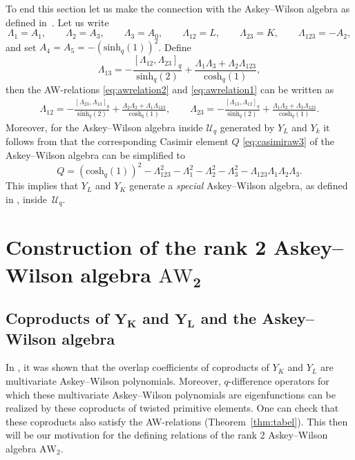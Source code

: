 \documentclass[10pt,a4paper]{amsart}
\numberwithin{equation}{section}
\newcommand{\AW}[1]{\mathrm{AW}_{#1}}
\newcommand{\bivariateawalgebra}{rank 2 Askey--Wilson algebra }
\newcommand{\chq}{\mathrm{cosh}_q}
\newcommand{\shq}{\mathrm{sinh}_q}
\newcommand{\Uq}{\mathcal{U}_q}
\begin{document}
To end this section let us make the connection with the Askey--Wilson algebra as defined in~\cite{CFGPRV2021}.
Let us write
\[
\Lambda_1=A_1, \qquad \Lambda_2=A_3, \qquad \Lambda_3=A_0,\qquad
\Lambda_{12} = L, \qquad \Lambda_{23}=K, \qquad \Lambda_{123}=-A_2,
\]
and set $A_4=A_5=-(\shq(1))^2$. Define
\[
\Lambda_{13}= -\frac{[\Lambda_{12},\Lambda_{23}]_q}{\shq(2)} + \frac{\Lambda_1 \Lambda_3+ \Lambda_2 \Lambda_{123}}{\chq(1)},
\]
then the AW-relations \eqref{eq:awrelation2} and \eqref{eq:awrelation1} can be written as
\begin{gather*}
	\Lambda_{12}= -\frac{[\Lambda_{23},\Lambda_{13}]_q}{\shq(2)} + \frac{\Lambda_2 \Lambda_3+ \Lambda_1 \Lambda_{123}}{\chq(1)}, \qquad
	\Lambda_{23}= -\frac{[\Lambda_{13},\Lambda_{12}]_q}{\shq(2)} + \frac{\Lambda_1 \Lambda_2+ \Lambda_3 \Lambda_{123}}{\chq(1)}.
\end{gather*}
Moreover, for the Askey--Wilson algebra inside $\Uq$ generated by $Y_L$ and $Y_k$ it follows from \cite[Theorem~2.17]{Terwilliger2011a} that the corresponding Casimir element $Q$ \eqref{eq:casimiraw3} of the Askey--Wilson algebra can be simplified to
\[
Q= (\chq(1))^2-\Lambda_{123}^2 - \Lambda_1^2-\Lambda_2^2 - \Lambda_3^2 - \Lambda_{123}\Lambda_1\Lambda_2\Lambda_3.
\]
This implies that $Y_L$ and $Y_K$ generate a \textit{special} Askey--Wilson algebra, as defined in \cite[Section~2.1]{CFGPRV2021}, inside~$\Uq$.

\section[Construction of the rank 2 Askey-Wilson algebra AW\_2]{Construction of the \bivariateawalgebra $\boldsymbol{\AW{2}}$}\label{sec:aw2}

\subsection[Coproducts of Y\_K and Y\_L and the Askey-Wilson algebra]{Coproducts of $\boldsymbol{Y_K}$ and $\boldsymbol{Y_L}$ and the Askey--Wilson algebra}\label{subsec:coproduc}

In \cite{Groenevelt2021}, it was shown that the overlap coefficients of coproducts of $Y_{K}$ and $Y_{L}$ are multivariate Askey--Wilson polynomials. Moreover, $q$-difference operators for which these multivariate Askey--Wilson polynomials are eigenfunctions can be realized by these coproducts of twisted primitive elements. One can check that these coproducts also satisfy the AW-relations (Theorem~\ref{thm:tabel}). This then will be our motivation for the defining relations of the \bivariateawalgebra $\AW{2}$.
\end{document}
